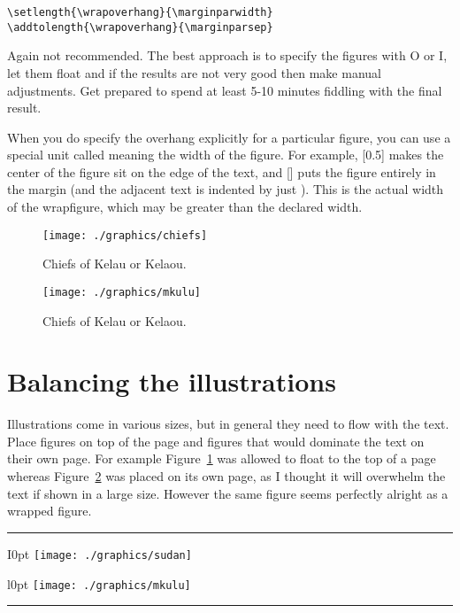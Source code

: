 \begin{verbatim}
\setlength{\wrapoverhang}{\marginparwidth}
\addtolength{\wrapoverhang}{\marginparsep}
\end{verbatim}

Again not recommended. The best approach is to specify the figures with O or I, let them float and if the results are
not very good then make manual adjustments. Get prepared to spend at least 5-10 minutes fiddling with the final result.

When you do specify the overhang explicitly for a particular figure, you can use a
special unit called \string\width meaning the width of the figure. For example, [0.5\string\width]
makes the center of the ﬁgure sit on the edge of the text, and [\string\width] puts the ﬁgure
entirely in the margin (and the adjacent text is indented by just \string\columnsep). This
\texttt{\string\width} is the actual width of the wrapfigure, which may be greater than the declared
width.

\begin{figure}[tb]
\texttt{[image: ./graphics/chiefs]}
\caption{Chiefs of Kelau or Kelaou.}
\label{fig:chiefs}
\end{figure}

\begin{figure}[p]
\centering

\texttt{[image: ./graphics/mkulu]}
\caption{Chiefs of Kelau or Kelaou.}
\label{fig:mkulu}
\end{figure}

\section{Balancing the illustrations}

Illustrations come in various sizes, but in general they need to flow with the text. Place figures on top of the page and figures that would dominate the text on their own page. For example Figure~\ref{fig:chiefs} was allowed to float to the top of a page whereas Figure~\ref{fig:mkulu} was placed on its own page, as I thought it will overwhelm the text if shown in a large size. However the same figure seems perfectly alright as a wrapped figure.
\vfill\vfill
\pagebreak
\vfill\vfill
\hrule
\vskip3pt
{\footnotesize
\begin{wrapfigure}{I}{0pt}
    \texttt{[image: ./graphics/sudan]}
 \end{wrapfigure}
\lipsum[1]
\begin{wrapfigure}{l}{0pt}
    \texttt{[image: ./graphics/mkulu]}
 \end{wrapfigure}
\lipsum[1]}
\vskip3pt
\hrule
{}

